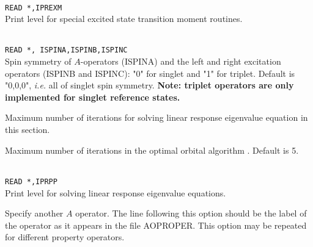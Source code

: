\begin{description}
\item{}\\
\verb|READ *,IPREXM|\\
Print level for special excited state transition moment routines.

\item{}\\
\verb|READ *, ISPINA,ISPINB,ISPINC|\\
Spin symmetry of $A$-operators (ISPINA)
and the left and right excitation operators (ISPINB and ISPINC):
"0" for singlet and "1" for triplet.
Default is "0,0,0", {\it i.e.\/} all of singlet spin symmetry.
{\bf Note: triplet operators are only implemented for singlet reference states.}


\item{}
Maximum number of iterations for solving linear response
eigenvalue equation in this section.

\item{}
Maximum number of iterations in the optimal
orbital algorithm 
\cite{tuhjahjajpjjcp84}. 
Default is 5.

\item{}\\
\verb|READ *,IPRPP|\\
Print level for solving linear response eigenvalue equations.

\item[\Key{PROPRT}]
Specify another $A$ operator. The line following this
option should be the label of the operator as it appears in the file
AOPROPER. This option may be repeated for different property operators.


\end{description}
